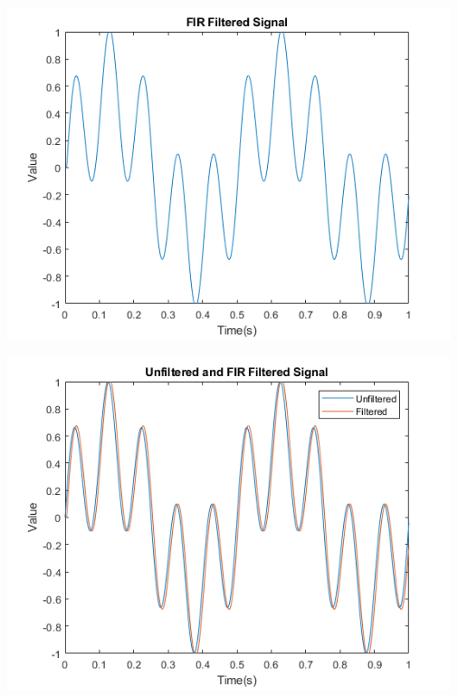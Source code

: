 \documentclass[12pt]{article}
\begin{document}
\includegraphics[width=5.1in]{3_f.png}

\includegraphics[width=5.1in]{3_fu.png}
\end{document}
